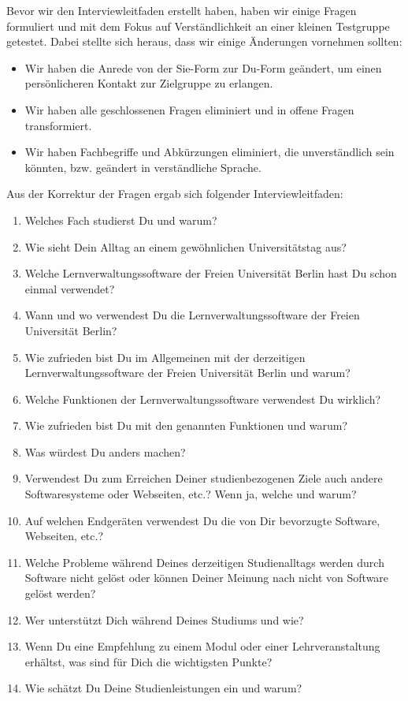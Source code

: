 \documentclass{article}
\begin{document}
Bevor wir den Interviewleitfaden erstellt haben, haben wir einige Fragen formuliert und mit dem Fokus auf Verständlichkeit an einer kleinen Testgruppe getestet. Dabei stellte sich heraus, dass wir einige Änderungen vornehmen sollten:
\begin{itemize}
\item Wir haben die Anrede von der Sie-Form zur Du-Form geändert, um einen persönlicheren Kontakt zur Zielgruppe zu erlangen.
\item Wir haben alle geschlossenen Fragen eliminiert und in offene Fragen transformiert.
\item Wir haben Fachbegriffe und Abkürzungen eliminiert, die unverständlich sein könnten, bzw. geändert in verständliche Sprache.
\end{itemize}
Aus der Korrektur der Fragen ergab sich folgender Interviewleitfaden:
\begin{enumerate}
\item Welches Fach studierst Du und warum?
\item Wie sieht Dein Alltag an einem gewöhnlichen Universitätstag aus?
\item Welche Lernverwaltungssoftware der Freien Universität Berlin hast Du schon einmal verwendet?
\item Wann und wo verwendest Du die Lernverwaltungssoftware der Freien Universität Berlin?
\item Wie zufrieden bist Du im Allgemeinen mit der derzeitigen Lernverwaltungssoftware der Freien Universität Berlin und warum?
\item Welche Funktionen der Lernverwaltungssoftware verwendest Du wirklich?
\item Wie zufrieden bist Du mit den genannten Funktionen und warum?
\item Was würdest Du anders machen?
\item Verwendest Du zum Erreichen Deiner studienbezogenen Ziele auch andere Softwaresysteme oder Webseiten, etc.? Wenn ja, welche und warum?
\item Auf welchen Endgeräten verwendest Du die von Dir bevorzugte Software, Webseiten, etc.?
\item Welche Probleme während Deines derzeitigen Studienalltags werden durch Software nicht gelöst oder können Deiner Meinung nach nicht von Software gelöst werden?
\item Wer unterstützt Dich während Deines Studiums und wie?
\item Wenn Du eine Empfehlung zu einem Modul oder einer Lehrveranstaltung erhältst, was sind für Dich die wichtigsten Punkte?
\item Wie schätzt Du Deine Studienleistungen ein und warum?
\end{enumerate}
\end{document}
